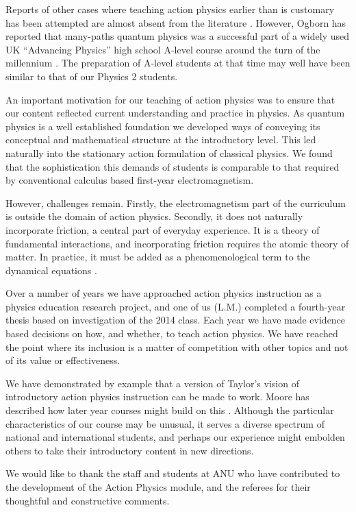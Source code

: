 \documentclass[prb,oncolumn,12pt]{revtex4-2}
\begin{document}
Reports of other cases where teaching action physics earlier than is customary has been attempted are almost absent from the literature \cite{Taylor2003}. However, Ogborn has reported that many-paths quantum physics was a successful part of a widely used UK ``Advancing Physics'' high school A-level course around the turn of the millennium \cite{OgbornGirep2006}.  The preparation of A-level students at that time may well have been similar to that of our Physics 2 students.

An important motivation for our teaching of action physics was to ensure that our content reflected current understanding and practice in physics. As quantum physics is a well established foundation we developed ways of conveying its conceptual and mathematical structure at the introductory level. This led naturally into the stationary action formulation of classical physics. We found that the sophistication this demands of students is comparable to that required by conventional calculus based first-year electromagnetism.

However, challenges remain. Firstly, the electromagnetism part of the curriculum is outside the domain of action physics. Secondly, it does not naturally incorporate friction, a central part of everyday experience.  It is a theory of fundamental interactions, and incorporating friction requires the atomic theory of matter. In practice, it must be added as a phenomenological term to the dynamical equations \cite{Goldstein}. 

Over a number of years we have approached action physics instruction as a physics education research project, \cite{McDermott} and one of us (L.M.) completed a fourth-year thesis based on investigation of the 2014 class. Each year we have made evidence based decisions on how, and whether, to teach action physics. We have reached the point where its inclusion is a matter of competition with other topics and not of its value or effectiveness. 

We have demonstrated by example that a version of Taylor's vision of introductory action physics instruction can be made to work. Moore has described how later year courses might build on this \cite{Moore}.  Although the particular characteristics of our course may be unusual, it serves a diverse spectrum of national and international students, and perhaps our experience might embolden others to take their introductory content in new directions.

\begin{acknowledgments}

We would like to thank the staff and students at ANU who have contributed to the development of the Action Physics module, and the referees for their thoughtful and constructive comments.

\end{acknowledgments}
\end{document}
